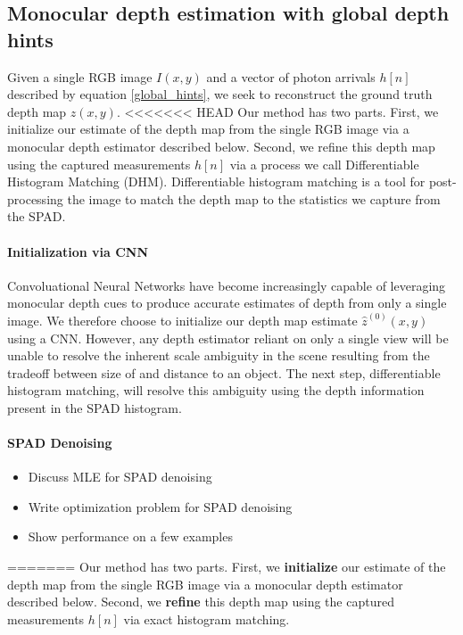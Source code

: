 \subsection{Monocular depth estimation with global depth hints}
Given a single RGB image $I(x,y)$ and a vector of photon arrivals $h[n]$
described by equation \ref{global_hints}, we seek to
reconstruct the ground truth depth map $z(x,y)$.
<<<<<<< HEAD
Our method has two parts. First, we initialize our estimate of the depth map from the single RGB
image via a monocular depth estimator described below. Second, we refine this depth map using
the captured measurements $h[n]$ via a process we call Differentiable Histogram
Matching (DHM).
Differentiable histogram matching is a tool for post-processing the image to
match the depth map to the statistics we capture from the SPAD.

\paragraph{Initialization via CNN}
Convoluational Neural Networks have become increasingly capable of leveraging
monocular depth cues to produce accurate estimates of depth
from only a single image. We therefore choose to initialize our depth map
estimate $\hat z^{(0)}(x,y)$ using
a CNN. However, any depth estimator reliant on only a single
view will be unable to resolve the inherent scale ambiguity in the scene resulting
from the tradeoff between size of and distance to an object. The next step,
differentiable histogram matching, will resolve this ambiguity using the depth
information present in the SPAD histogram.

\paragraph{SPAD Denoising}
\begin{itemize}
  \item Discuss MLE for SPAD denoising
  \item Write optimization problem for SPAD denoising
  \item Show performance on a few examples 
\end{itemize}
=======
Our method has two parts. First, we \textbf{initialize} our estimate of the depth map from the single RGB
image via a monocular depth estimator described below. Second, we \textbf{refine} this depth map using
the captured measurements $h[n]$ via exact histogram matching. 

